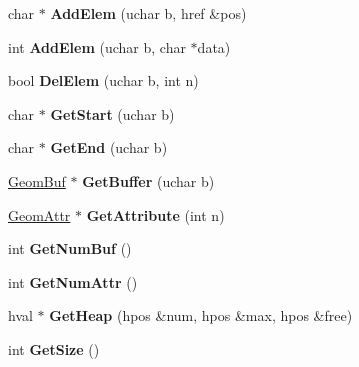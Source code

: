 \begin{DoxyCompactItemize}
\item 
\hypertarget{class_geom_x_abaff26d8bfefff909c6dda3313196f41}{char $\ast$ {\bfseries Add\+Elem} (uchar b, href \&pos)}\label{class_geom_x_abaff26d8bfefff909c6dda3313196f41}

\item 
\hypertarget{class_geom_x_a03ffed73d6d37ffbc3a9a037a3772cd9}{int {\bfseries Add\+Elem} (uchar b, char $\ast$data)}\label{class_geom_x_a03ffed73d6d37ffbc3a9a037a3772cd9}

\item 
\hypertarget{class_geom_x_ab32ca26c25e4668ca147262bb3c9c55d}{bool {\bfseries Del\+Elem} (uchar b, int n)}\label{class_geom_x_ab32ca26c25e4668ca147262bb3c9c55d}

\item 
\hypertarget{class_geom_x_a62e2c6538aee0e71181f03c6e103925f}{char $\ast$ {\bfseries Get\+Start} (uchar b)}\label{class_geom_x_a62e2c6538aee0e71181f03c6e103925f}

\item 
\hypertarget{class_geom_x_ab271fd8b4ce5de256d865e7e2863226c}{char $\ast$ {\bfseries Get\+End} (uchar b)}\label{class_geom_x_ab271fd8b4ce5de256d865e7e2863226c}

\item 
\hypertarget{class_geom_x_a695878118c530a2340b65d8a1dd3add4}{\hyperlink{class_geom_buf}{Geom\+Buf} $\ast$ {\bfseries Get\+Buffer} (uchar b)}\label{class_geom_x_a695878118c530a2340b65d8a1dd3add4}

\item 
\hypertarget{class_geom_x_a2c4803368fd81df4fce9d6b487cafc90}{\hyperlink{class_geom_attr}{Geom\+Attr} $\ast$ {\bfseries Get\+Attribute} (int n)}\label{class_geom_x_a2c4803368fd81df4fce9d6b487cafc90}

\item 
\hypertarget{class_geom_x_a6d77d65964b6f9207f5d24d12b6daf58}{int {\bfseries Get\+Num\+Buf} ()}\label{class_geom_x_a6d77d65964b6f9207f5d24d12b6daf58}

\item 
\hypertarget{class_geom_x_a903b242cad42c044fad333707bf1481a}{int {\bfseries Get\+Num\+Attr} ()}\label{class_geom_x_a903b242cad42c044fad333707bf1481a}

\item 
\hypertarget{class_geom_x_ae8a503f155bd8121d04239c1e0aeedd1}{hval $\ast$ {\bfseries Get\+Heap} (hpos \&num, hpos \&max, hpos \&free)}\label{class_geom_x_ae8a503f155bd8121d04239c1e0aeedd1}

\item 
\hypertarget{class_geom_x_a7676578307389e54244b1bbbfb4499e9}{int {\bfseries Get\+Size} ()}\label{class_geom_x_a7676578307389e54244b1bbbfb4499e9}


\end{DoxyCompactItemize}
